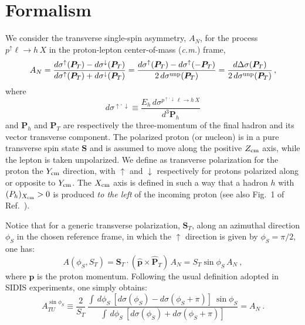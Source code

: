 \documentclass[nofootinbib,superscriptaddress,aps]{revtex4}
\newcommand{\be}{\begin{equation}}
\newcommand{\ee}{\end{equation}}
\newcommand{\pup}{p^\uparrow}
\begin{document}
\section{Formalism}
\label{form}

We consider the transverse single-spin asymmetry, $A_N$, for the process $\pup \ell \to h \, X$ in the proton-lepton center-of-mass ({\it c.m.}) frame,
 \be
A_N = \frac{d\sigma^\uparrow(\bm{P}_T) - d\sigma^\downarrow(\bm{P}_T)}
           {d\sigma^\uparrow(\bm{P}_T) + d\sigma^\downarrow(\bm{P}_T)}
    = \frac{d\sigma^\uparrow(\bm{P}_T) - d\sigma^\uparrow(-\bm{P}_T)}
           {2 \, d\sigma^{\rm unp}(\bm{P}_T)} = \frac{d\Delta \sigma(\bm{P}_T)}{2 \, d\sigma^{\rm unp}(\bm{P}_T)}\,, \label{an}
\ee
where
%
\be
d\sigma^{\uparrow, \downarrow} \equiv \frac{E_h \, d\sigma^{p^{\uparrow,
\downarrow} \, \ell \to h\, X}}{d^{3} \bm{P}_h}
\ee
and $\bm{P}_h$ and $\bm{P}_T$ are respectively the three-momentum of the final hadron and its vector transverse component. The polarized proton (or nucleon) is in a pure transverse spin state $\bm{S}$ and is assumed to move along the positive $Z_{\rm cm}$ axis, while the lepton is taken unpolarized. We define as transverse polarization for the proton the $Y_{\rm cm}$ direction, with $\uparrow$ and $\downarrow$ respectively for protons polarized along or opposite to $Y_{\rm cm}$. The $X_{\rm cm}$ axis is defined in such a way that a hadron $h$ with $(P_h)_{X_{\rm cm}} > 0$ is produced {\it to the left} of the incoming proton (see also Fig.~1 of Ref.~\cite{Anselmino:2009pn}).

Notice that for a generic transverse polarization, $\bm{S}_T$, along an azimuthal direction $\phi_S$ in the chosen reference frame, in which the $\uparrow$ direction is given by $\phi_S = \pi/2$, one has:
%
\be
A(\phi_S, S_T) = \bm{S}_T \cdot (\hat{\bm{p}} \times \hat{\bm{P}}_T) \, A_N = S_T \sin\phi_S \, A_N \>, \label{phis}
\ee
%
where $\bm{p}$ is the proton momentum.
Following the usual definition adopted in SIDIS experiments, one simply obtains:
%
\be
A_{TU}^{\sin\phi_S} \equiv \frac{2}{S_T} \,
\frac{\int \, d\phi_S \> [d\sigma(\phi_S) - d\sigma(\phi_S + \pi)]\> \sin\phi_S}
     {\int \, d\phi_S \> [d\sigma(\phi_S) + d\sigma(\phi_S + \pi)]}
= A_N \>.
\label{ATU}
\ee
\end{document}
